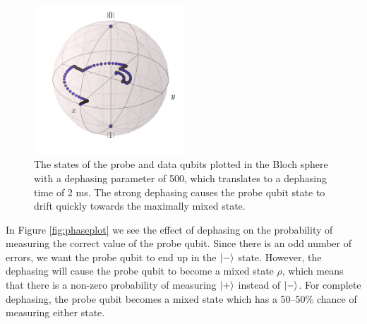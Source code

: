 \documentclass[%
 reprint,
 amsmath,amssymb,
 aps,
]{revtex4-1}
\begin{document}
\begin{figure}[!h]
  \centering
    \includegraphics[width=0.5\textwidth]{Figures/Circ_orbit_odd_500_dephasing.png}
      \caption{The states of the probe and data qubits plotted in the Bloch sphere with a dephasing parameter of 500, which translates to a dephasing time of 2 ms. The strong dephasing causes the probe qubit state to drift quickly towards the maximally mixed state. }
      \label{fig:BlochsphereDephasing2}
\end{figure}

In Figure \ref{fig:phaseplot} we see the effect of dephasing on the probability of measuring the correct value of the probe qubit. Since there is an odd number of errors, we want the probe qubit to end up in the $\ket{-}$ state. However, the dephasing will cause the probe qubit to become a mixed state $\rho$, which means that there is a non-zero probability of measuring $\ket{+} $ instead of $\ket{-}$. For complete dephasing, the probe qubit becomes a mixed state which has a 50--50\% chance of measuring either state. 
\end{document}
